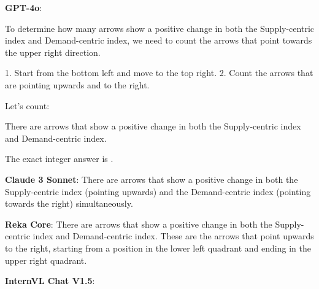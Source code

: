 \begin{wronganswer}
\textbf{GPT-4o}: \small{To determine how many arrows show a positive change in both the Supply-centric index and Demand-centric index, we need to count the arrows that point towards the upper right direction.

1. Start from the bottom left and move to the top right.
2. Count the arrows that are pointing upwards and to the right.

Let's count:

There are  arrows that show a positive change in both the Supply-centric index and Demand-centric index.

The exact integer answer is .}
\end{wronganswer}

\begin{wronganswer}
\textbf{Claude 3 Sonnet}: \small{There are  arrows that show a positive change in both the Supply-centric index (pointing upwards) and the Demand-centric index (pointing towards the right) simultaneously.}
\end{wronganswer}

\begin{wronganswer}
\textbf{Reka Core}: \small{ There are  arrows that show a positive change in both the Supply-centric index and Demand-centric index. These are the arrows that point upwards to the right, starting from a position in the lower left quadrant and ending in the upper right quadrant.}
\end{wronganswer}

\begin{wronganswer}
\textbf{InternVL Chat V1.5}: \small{}
\end{wronganswer}

